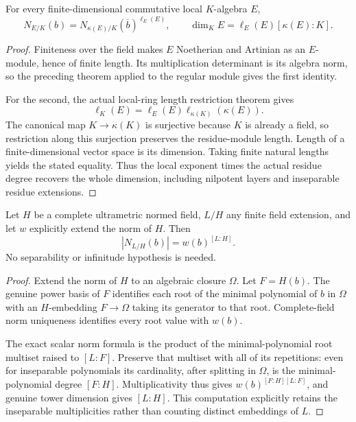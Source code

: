 \begin{theorem}
\label{spectrum:local-algebra-norm-length}
\leanok
{}
For every finite-dimensional commutative local $K$-algebra $E$,
\[
 N_{E/K}(b)=N_{\kappa(E)/K}(\overline b)^{\ell_E(E)},
 \qquad
 \dim_K E=\ell_E(E)[\kappa(E):K].
\]
\end{theorem}
\begin{proof}
Finiteness over the field makes $E$ Noetherian and Artinian as an
$E$-module, hence of finite length. Its multiplication determinant is its
algebra norm, so the preceding theorem applied to the regular module gives
the first identity.

For the second, the actual local-ring length restriction theorem gives
\[
 \ell_K(E)=\ell_E(E)\ell_{\kappa(K)}(\kappa(E)).
\] The canonical map
$K\to\kappa(K)$ is surjective because $K$ is already a field, so restriction
along this surjection preserves the residue-module length. Length of a
finite-dimensional vector space is its dimension. Taking finite natural
lengths yields the stated equality. Thus the local exponent times the
actual residue degree recovers the whole dimension, including nilpotent
layers and inseparable residue extensions.
\end{proof}

\begin{theorem}
\label{spectrum:inseparable-scalar-field-norm}
\leanok
{}
Let $H$ be a complete ultrametric normed field, $L/H$ any finite field
extension, and let $w$ explicitly extend the norm of $H$. Then
\[
 |N_{L/H}(b)|=w(b)^{[L:H]}.
\]
No separability or infinitude hypothesis is needed.
\end{theorem}
\begin{proof}
Extend the norm of $H$ to an algebraic closure $\Omega$. Let $F=H(b)$.
The genuine power basis of $F$ identifies each root of the minimal
polynomial of $b$ in $\Omega$ with an $H$-embedding $F\to\Omega$ taking its
generator to that root. Complete-field norm uniqueness identifies every
root value with $w(b)$.

The exact scalar norm formula is the product of the minimal-polynomial
root multiset raised to $[L:F]$. Preserve that multiset with all of its
repetitions: even for inseparable polynomials its cardinality, after
splitting in $\Omega$, is the minimal-polynomial degree $[F:H]$.
Multiplicativity thus gives $w(b)^{[F:H][L:F]}$, and genuine tower
dimension gives $[L:H]$. This computation explicitly retains the
inseparable multiplicities rather than counting distinct embeddings of $L$.
\end{proof}

